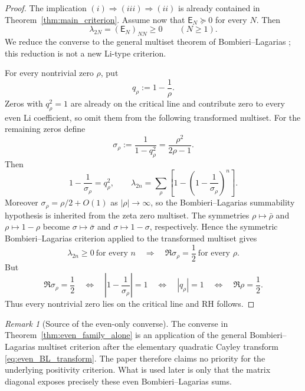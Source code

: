 \documentclass[11pt]{amsart}
\numberwithin{equation}{section}
\theoremstyle{plain}
\theoremstyle{definition}
\theoremstyle{remark}
\newtheorem{remark}[theorem]{Remark}
\newcommand{\RH}{\mathrm{RH}}
\newcommand{\E}{\mathsf E}
\begin{document}
\begin{proof}
The implication \((i)\Rightarrow(iii)\Rightarrow(ii)\) is already contained in
Theorem~\ref{thm:main_criterion}.  Assume now that \(\E_N\succeq0\) for every \(N\).  Then
\[
\lambda_{2N}=(\E_N)_{NN}\ge0
\qquad(N\ge1).
\]
We reduce the converse to the general multiset theorem of Bombieri--Lagarias
\cite[Theorem~1 and its symmetric corollary]{BombieriLagarias1999}; this reduction is not a
new Li-type criterion.

For every nontrivial zero \(\rho\), put
\[
q_\rho:=1-\frac1\rho.
\]
Zeros with \(q_\rho^2=1\) are already on the critical line and contribute zero to every even Li
coefficient, so omit them from the following transformed multiset.  For the remaining zeros define
\begin{equation}
\sigma_\rho:=\frac1{1-q_\rho^2}=\frac{\rho^2}{2\rho-1}.
\label{eq:even_BL_transform}
\end{equation}
Then
\begin{equation}
1-\frac1{\sigma_\rho}=q_\rho^2,
\qquad
\lambda_{2n}
=\sum_\rho\left[1-\left(1-\frac1{\sigma_\rho}\right)^n\right].
\label{eq:even_Li_as_BL_sum}
\end{equation}
Moreover \(\sigma_\rho=\rho/2+O(1)\) as \(|\rho|\to\infty\), so the Bombieri--Lagarias
summability hypothesis is inherited from the zeta zero multiset.  The symmetries
\(\rho\mapsto\bar\rho\) and \(\rho\mapsto1-\rho\) become
\(\sigma\mapsto\bar\sigma\) and \(\sigma\mapsto1-\sigma\), respectively.  Hence the symmetric
Bombieri--Lagarias criterion applied to the transformed multiset gives
\[
\lambda_{2n}\ge0\ \text{for every }n
\quad\Longrightarrow\quad
\Re\sigma_\rho=\frac12\ \text{for every }\rho.
\]
But
\[
\Re\sigma_\rho=\frac12
\quad\Longleftrightarrow\quad
\left|1-\frac1{\sigma_\rho}\right|=1
\quad\Longleftrightarrow\quad
|q_\rho|=1
\quad\Longleftrightarrow\quad
\Re\rho=\frac12.
\]
Thus every nontrivial zero lies on the critical line and \(\RH\) follows.
\end{proof}

\begin{remark}[Source of the even-only converse]
\label{rem:even_only_source}
The converse in Theorem~\ref{thm:even_family_alone} is an application of the general
Bombieri--Lagarias multiset criterion after the elementary quadratic Cayley transform
\eqref{eq:even_BL_transform}.  The paper therefore claims no priority for the underlying
positivity criterion.  What is used later is only that the matrix diagonal exposes precisely these
even Bombieri--Lagarias sums.
\end{remark}
\end{document}
